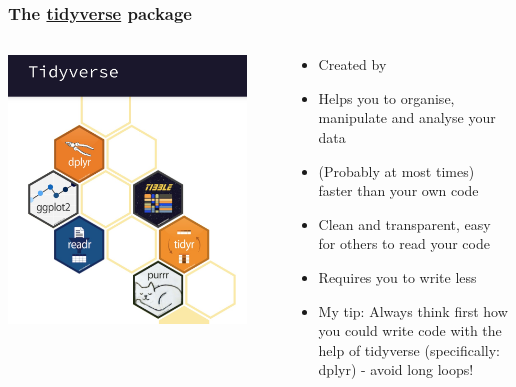 \documentclass{beamer}
\begin{document}
\begin{frame}
\frametitle{The \href{https://www.tidyverse.org}{tidyverse} package}
\begin{columns}
\begin{center}
\includegraphics[width=0.9\textwidth]{tidy.jpg}
\end{center}
\begin{center}
\begin{itemize}
\item Created by {}
\item Helps you to organise, manipulate and analyse your data
\item (Probably at most times) faster than your own code 
\item Clean and transparent, easy for others to read your code
\item Requires you to write less
\item My tip: Always think first how you could write code with the help of tidyverse (specifically: dplyr) - avoid long loops!
\end{itemize}
\end{center}
\end{columns}
\end{frame}
\end{document}
